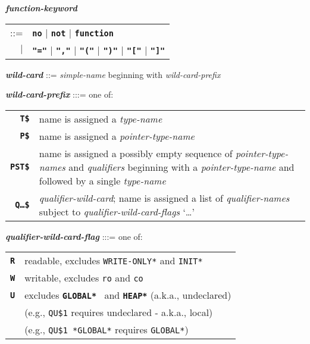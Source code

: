 \documentclass[12pt]{article}
\newcommand{\TT}[1]{{\tt \bfseries #1}}
\newcommand{\ttkey}[1]{{\tt \bfseries #1}}
\newcommand{\emkey}[1]{{\em \bfseries #1}}
\newenvironment{indpar}[1][0.3in]%
	{\begin{list}{}%
		     {\setlength{\itemsep}{0in}%
		      \setlength{\topsep}{0in}%
		      \setlength{\parsep}{1ex}%
		      \setlength{\labelwidth}{#1}%
		      \setlength{\leftmargin}{#1}%
		      \addtolength{\leftmargin}{\labelsep}}%
	 \item}%
	{\end{list}}
\begin{document}
\begin{indpar}
\emkey{function-keyword}
    \begin{tabular}[t]{rl}
    ::= & \TT{no} $|$ \TT{not} $|$ \TT{function} \\
    $|$ & \TT{"="} $|$ \TT{","} $|$ \TT{"("} $|$ \TT{")"} $|$
          \TT{"["} $|$ \TT{"]"}
    \end{tabular}

\emkey{wild-card}\label{WILD-CARD}
    ::= {\em simple-name} beginning with {\em wild-card-prefix}

\emkey{wild-card-prefix}\label{WILD-CARD-PREFIX} :::= one of: \\
\hspace*{0.2in}\begin{tabular}{rp{4in}}
\ttkey{T\$} & name is assigned a {\em type-name} \\
\ttkey{P\$} & name is assigned a {\em pointer-type-name} \\
\ttkey{PST\$} & name is assigned a possibly empty
               sequence of {\em pointer-type-names}
	       and {\em qualifiers} beginning with
	       a {\em pointer-type-name} and followed by a single
	       {\em type-name} \\
\ttkey{Q\ldots\$} & {\em qualifier-wild-card}; name is assigned a
                    list of {\em qualifier-names} subject to
		    {\em qualifier-wild-card-flags} `\ldots'\\
\end{tabular}

\emkey{qualifier-wild-card-flag}\label{QUALIFIER-WILD-FLAG} :::= one of: \\
\hspace*{0.2in}\begin{tabular}{rl}
\ttkey{R} & readable, excludes {\tt *WRITE-ONLY*} and {\tt *INIT*} \\
\ttkey{W} & writable, excludes {\tt ro} and {\tt co} \\
\ttkey{U} & excludes \TT{*GLOBAL*} ~and \TT{*HEAP*} (a.k.a., undeclared) \\
          & (e.g., {\tt QU\$1} requires undeclared - a.k.a., local) \\
          & (e.g., {\tt QU\$1 *GLOBAL*} requires {\tt *GLOBAL*}) \\
\end{tabular}
\end{indpar}
\end{document}

